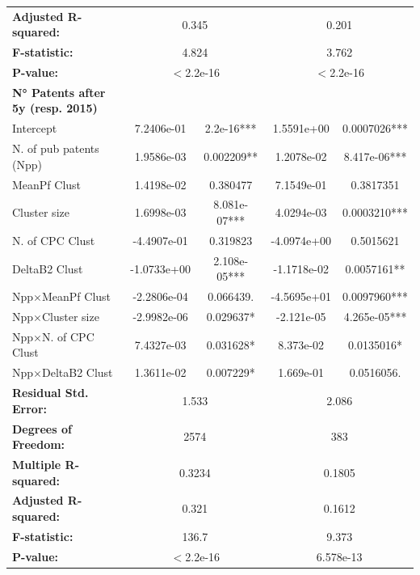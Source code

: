 \documentclass[12pt]{article}
\begin{document}
\begin{table}[h!]
\begin{tabular}{lcccc}
\multicolumn{1}{l}{\textbf{Adjusted R-squared:}} & \multicolumn{2}{c}{0.345} & \multicolumn{2}{c}{0.201 } \\
\multicolumn{1}{l}{\textbf{F-statistic:}} & \multicolumn{2}{c}{4.824} & \multicolumn{2}{c}{3.762} \\
\multicolumn{1}{l}{\textbf{P-value:}} & \multicolumn{2}{c}{$<$2.2e-16} & \multicolumn{2}{c}{$<$2.2e-16} \\
\midrule
\textbf{N° Patents after 5y (resp. 2015)} & & & & \\
Intercept          & 7.2406e-01 & 2.2e-16***  & 1.5591e+00 & 0.0007026*** \\
N. of pub patents (Npp)    & 1.9586e-03 & 0.002209**    & 1.2078e-02 & 8.417e-06*** \\
MeanPf Clust            & 1.4198e-02 & 0.380477   & 7.1549e-01 & 0.3817351 \\
Cluster size                 & 1.6998e-03 & 8.081e-07***    & 4.0294e-03 & 0.0003210*** \\
N. of CPC Clust                 & -4.4907e-01 & 0.319823    & -4.0974e+00 & 0.5015621 \\
DeltaB2 Clust                 & -1.0733e+00 & 2.108e-05***    & -1.1718e-02 & 0.0057161** \\
Npp$\times$MeanPf Clust            & -2.2806e-04 & 0.066439.   & -4.5695e+01 & 0.0097960*** \\
Npp$\times$Cluster size       & -2.9982e-06 & 0.029637*   & -2.121e-05 & 4.265e-05*** \\
Npp$\times$N. of CPC Clust           & 7.4327e-03 & 0.031628* & 8.373e-02 & 0.0135016* \\
Npp$\times$DeltaB2 Clust            & 1.3611e-02 & 0.007229* & 1.669e-01 & 0.0516056. \\
\midrule
\multicolumn{1}{l}{\textbf{Residual Std. Error:}} & \multicolumn{2}{c}{1.533} & \multicolumn{2}{c}{2.086} \\
\multicolumn{1}{l}{\textbf{Degrees of Freedom:}} & \multicolumn{2}{c}{2574} & \multicolumn{2}{c}{383} \\
\multicolumn{1}{l}{\textbf{Multiple R-squared:}} & \multicolumn{2}{c}{0.3234} & \multicolumn{2}{c}{0.1805} \\
\multicolumn{1}{l}{\textbf{Adjusted R-squared:}} & \multicolumn{2}{c}{0.321} & \multicolumn{2}{c}{0.1612} \\
\multicolumn{1}{l}{\textbf{F-statistic:}} & \multicolumn{2}{c}{136.7} & \multicolumn{2}{c}{9.373} \\
\multicolumn{1}{l}{\textbf{P-value:}} & \multicolumn{2}{c}{$<$2.2e-16} & \multicolumn{2}{c}{6.578e-13} \\
\bottomrule
\end{tabular}
\end{table}
\end{document}
